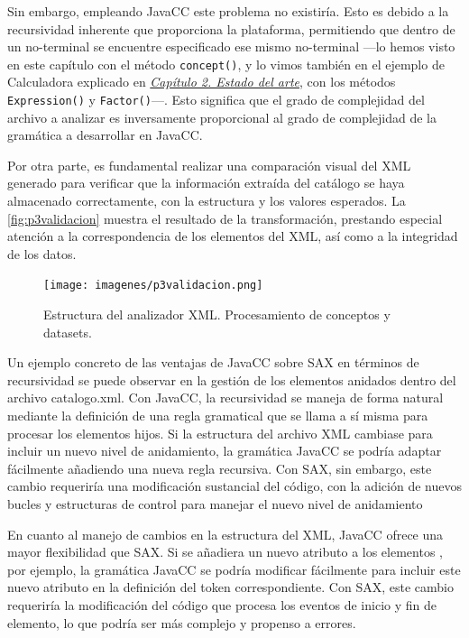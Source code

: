 Sin embargo, empleando JavaCC este problema no existiría. Esto es debido a la recursividad inherente que proporciona la plataforma, permitiendo que dentro de un no-terminal se encuentre especificado ese mismo no-terminal ---lo hemos visto en este capítulo con el método \lstinline|concept()|, y lo vimos también en el ejemplo de Calculadora explicado en \hyperref[sec:cap2]{\textit{Capítulo 2. Estado del arte}}, con los métodos \lstinline|Expression()| y \lstinline|Factor()|---. Esto significa que el grado de complejidad del archivo a analizar es inversamente proporcional al grado de complejidad de la gramática a desarrollar en JavaCC.

Por otra parte, es fundamental realizar una comparación visual del XML generado para verificar que la información extraída del catálogo se haya almacenado correctamente, con la estructura y los valores esperados. La \autoref{fig:p3validacion} muestra el resultado de la transformación, prestando especial atención a la correspondencia de los elementos del XML, así como a la integridad de los datos.

\begin{figure}[H]
	\centering
	\texttt{[image: imagenes/p3validacion.png]}
	\caption{\label{fig:p3validacion}Estructura del analizador XML. Procesamiento de conceptos y datasets.}
\end{figure}


Un ejemplo concreto de las ventajas de JavaCC sobre SAX en términos de recursividad se puede observar en la gestión de los elementos anidados dentro del archivo catalogo.xml. Con JavaCC, la recursividad se maneja de forma natural mediante la definición de una regla gramatical que se llama a sí misma para procesar los elementos hijos. Si la estructura del archivo XML cambiase para incluir un nuevo nivel de anidamiento, la gramática JavaCC se podría adaptar fácilmente añadiendo una nueva regla recursiva. Con SAX, sin embargo, este cambio requeriría una modificación sustancial del código, con la adición de nuevos bucles y estructuras de control para manejar el nuevo nivel de anidamiento


En cuanto al manejo de cambios en la estructura del XML, JavaCC ofrece una mayor flexibilidad que SAX. Si se añadiera un nuevo atributo a los elementos , por ejemplo, la gramática JavaCC se podría modificar fácilmente para incluir este nuevo atributo en la definición del token correspondiente. Con SAX, este cambio requeriría la modificación del código que procesa los eventos de inicio y fin de elemento, lo que podría ser más complejo y propenso a errores.

